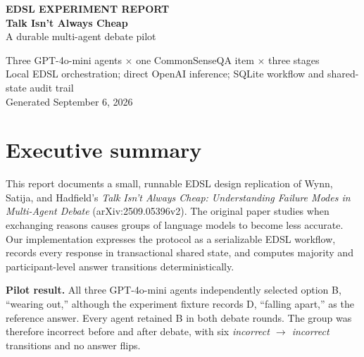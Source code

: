 \documentclass[10pt]{article}
\newcommand{\callout}[1]{\begin{center}\colorbox{pale}{\parbox{0.93\linewidth}{#1}}\end{center}}
\begin{document}
\begin{titlepage}
\pagecolor{navy}\color{white}
\vspace*{1.1in}
{\Large\textbf{EDSL EXPERIMENT REPORT}}\\[0.35in]
{\fontsize{31}{35}\selectfont\textbf{Talk Isn't Always Cheap}}\\[0.18in]
{\LARGE A durable multi-agent debate pilot}\\[0.7in]
\vfill
{\large Three GPT-4o-mini agents $\times$ one CommonSenseQA item $\times$ three stages}\\[0.12in]
{\normalsize Local EDSL orchestration; direct OpenAI inference; SQLite workflow and shared-state audit trail}\\[0.5in]
{\small Generated September 6, 2026}
\end{titlepage}
\nopagecolor\color{ink}

\section*{Executive summary}

This report documents a small, runnable EDSL design replication of Wynn, Satija, and Hadfield's
\emph{Talk Isn't Always Cheap: Understanding Failure Modes in Multi-Agent Debate}
(arXiv:2509.05396v2). The original paper studies when exchanging reasons causes groups of language
models to become less accurate. Our implementation expresses the protocol as a serializable EDSL
workflow, records every response in transactional shared state, and computes majority and
participant-level answer transitions deterministically.

\callout{\textbf{Pilot result.} All three GPT-4o-mini agents independently selected option B,
``wearing out,'' although the experiment fixture records D, ``falling apart,'' as the reference
answer. Every agent retained B in both debate rounds. The group was therefore incorrect before and
after debate, with six \emph{incorrect $\rightarrow$ incorrect} transitions and no answer flips.}
\end{document}
